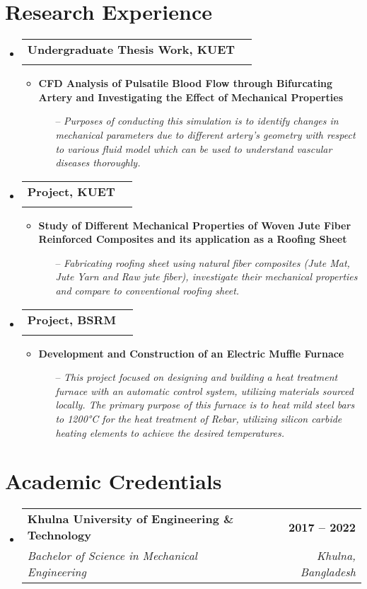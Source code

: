 \documentclass[letterpaper,11pt]{article}
\makeatletter
\newcommand{\resumeItem}[1]{
  \item\small{
    {#1 \vspace{-2pt}}
  }
}
\newcommand{\resumeSubheading}[4]{
  \vspace{-2pt}\item
    \begin{tabular*}{1.0\textwidth}[t]{l@{\extracolsep{\fill}}r}
      \textbf{#1} & \textbf{\small #2} \\
      \textit{\small#3} & \textit{\small #4} \\
    \end{tabular*}\vspace{-5pt}
}
\newcommand{\resumeSubHeadingListStart}{\begin{itemize}[leftmargin=0.0in, label={}]}
\newcommand{\resumeSubHeadingListEnd}{\end{itemize}}
\newcommand{\resumeItemListStart}{\begin{itemize}}
\newcommand{\resumeItemListEnd}{\end{itemize}\vspace{-5pt}}
\makeatother
\begin{document}
\section{Research Experience}
\resumeSubHeadingListStart
\resumeSubheading
{Undergraduate Thesis Work, KUET}{ }{ }{ }
\vspace{-15pt}
\resumeItemListStart
\resumeItem{ \textbf{CFD Analysis of Pulsatile Blood Flow through Bifurcating Artery and Investigating the Effect of Mechanical Properties}}
 \begin{enumerate}
\item [--]\textit{Purposes of conducting this simulation is to identify changes in mechanical parameters due to different artery’s geometry with respect to various fluid model which can be used to understand vascular diseases thoroughly.}
 \end{enumerate}
\resumeItemListEnd
\resumeSubheading
{Project, KUET}{ }{ }{ }
\vspace{-15pt}
\resumeItemListStart
\resumeItem{\textbf{Study of Different Mechanical Properties of Woven Jute Fiber Reinforced Composites and its application as a Roofing Sheet}}
\begin{enumerate}
\item [--]\textit{Fabricating roofing sheet using natural fiber composites (Jute Mat, Jute Yarn and Raw jute fiber), investigate their mechanical properties and compare to conventional roofing sheet.}
 \end{enumerate}
\resumeItemListEnd
\resumeSubheading
{Project, BSRM}{ }{ }{ }
\vspace{-15pt}
\resumeItemListStart
\resumeItem{\textbf{Development and Construction of an Electric Muffle Furnace}}
\begin{enumerate}
\item [--]\textit{ This project focused on designing and building a heat treatment furnace with an automatic control system, utilizing materials sourced locally. The primary purpose of this furnace is to heat mild steel bars to 1200°C for the heat treatment of Rebar, utilizing silicon carbide heating elements to achieve the desired temperatures.}
 \end{enumerate}
\resumeItemListEnd
\resumeSubHeadingListEnd
\section{Academic Credentials}
\resumeSubHeadingListStart
\resumeSubheading
{Khulna University of Engineering \& Technology}{2017 -- 2022}
{Bachelor of Science in Mechanical Engineering}{Khulna, Bangladesh}
\resumeSubHeadingListEnd
\end{document}
